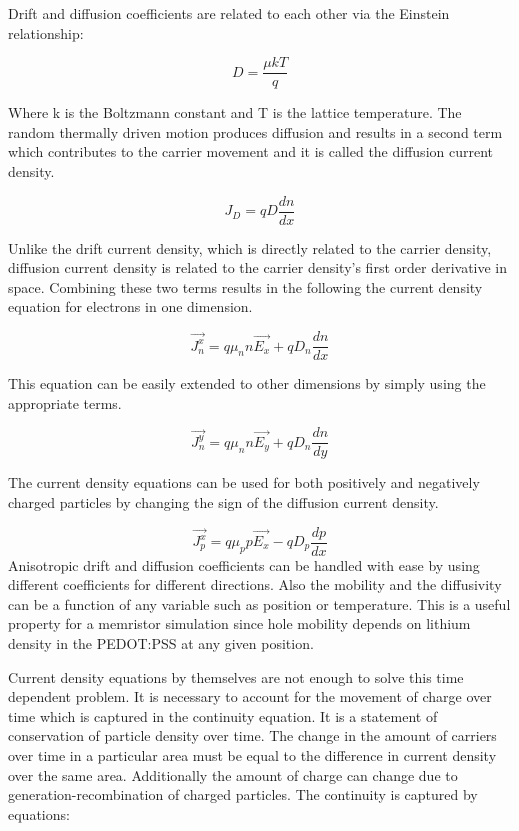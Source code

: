 \begin{doublespace}
Drift and diffusion coefficients are related to each other via the Einstein relationship\cite{snowden}:

\begin{equation}
D=\frac{\mu k T}{q}
\end{equation}

Where k is the Boltzmann constant and T is the lattice temperature. The random thermally driven motion produces diffusion and results in a second term which contributes to the carrier movement and it is called the diffusion current density.

\begin{equation}
J_D=qD\frac{dn}{dx}
\end{equation}

Unlike the drift current density, which is directly related to the carrier density, diffusion current density is related to the carrier density's first order derivative in space. Combining these two terms results in the following the current density equation for electrons in one dimension.

\begin{equation}
\vec{J_n^x}=q \mu_{n} n \vec{E_x}+qD_{n} \frac{dn}{dx} 
\label{cdenn}
\end{equation}

This equation can be easily extended to other dimensions by simply using the appropriate terms.

\begin{equation}
\vec{J_n^y}=q \mu_{n} n \vec{E_y}+qD_{n} \frac{dn}{dy} 
\end{equation}

The current density equations can be used for both positively and negatively charged particles by changing the sign of the diffusion current density.

\begin{equation}
\vec{J_p^x}=q \mu_{p} p \vec{E_x}-qD_{p} \frac{dp}{dx} 
\label{cdenp}
\end{equation}
Anisotropic drift and diffusion coefficients can be handled with ease by using different coefficients for different directions. Also the mobility and the diffusivity can be a function of any variable such as position or temperature. This is a useful property for a memristor simulation since hole mobility depends on lithium density in the PEDOT:PSS at any given position. 

Current density equations by themselves are not enough to solve this time dependent problem. It is necessary to account for the movement of charge over time which is captured in the continuity equation. It is a statement of conservation of particle density over time. The change in the amount of carriers over time in a particular area must be equal to the difference in current density over the same area. Additionally the amount of charge can change due to generation-recombination of charged particles. The continuity is captured by equations:



\end{doublespace}
